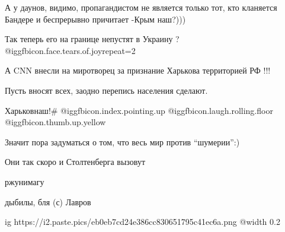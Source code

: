  
 
 
 
 
\zzSecCmt

\begin{itemize} %

А у даунов, видимо, пропагандистом не является только тот, кто кланяется
Бандере и беспрерывно причитает -Крым  наш?)))


Так теперь его на границе непустят в Украину ?  @igg{fbicon.face.tears.of.joy}{repeat=2} 

А CNN внесли на миротворец за признание Харькова территорией РФ !!!


Пусть вносят всех, заодно перепись населения сделают.


Харьковнаш!\# @igg{fbicon.index.pointing.up} @igg{fbicon.laugh.rolling.floor}
@igg{fbicon.thumb.up.yellow} 


Значит пора задуматься о том, что весь мир против \enquote{шумерии}:)


Они так скоро и Столтенберга вызовут


ржунимагу


дыбилы, бля (с) Лавров


\ifcmt
  ig https://i2.paste.pics/eb0eb7cd24e386cc830651795c41ec6a.png
  @width 0.2
\fi

\end{itemize} %
